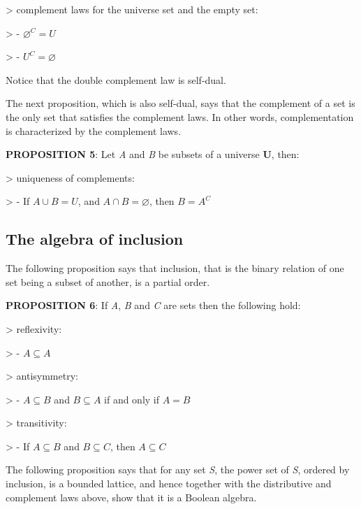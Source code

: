 > complement laws for the universe set and the empty set:

>    - $\varnothing^C = U$

>    - $U^C = \varnothing$



Notice that the double complement law is self-dual.



The next proposition, which is also self-dual, says that the complement of a set is the
only set that satisfies the complement laws. In other words, complementation is
characterized by the complement laws.



\textbf{PROPOSITION 5}: Let \textit{A} and \textit{B} be subsets of a universe \textbf{U}, then:



> uniqueness of complements:

>    - If $A \cup B = U$, and $A \cap B = \varnothing$, then $B = A^C$




\subsection{The algebra of inclusion}
\label{sss:thea-57ec}




The following proposition says that inclusion, that is the binary relation of one set
being a subset of another, is a partial order.



\textbf{PROPOSITION 6}: If \textit{A}, \textit{B} and \textit{C} are sets then the following hold:



> reflexivity:

>    - $A \subseteq A$



> antisymmetry:

>    - $A \subseteq B$ and $B \subseteq A$ if and only if $A = B$



> transitivity:

>    - If $A \subseteq B$ and $B \subseteq C$, then $A \subseteq C$



The following proposition says that for any set \textit{S}, the power set of \textit{S},
ordered by inclusion, is a bounded lattice, and hence together with the distributive and
complement laws above, show that it is a Boolean algebra.



